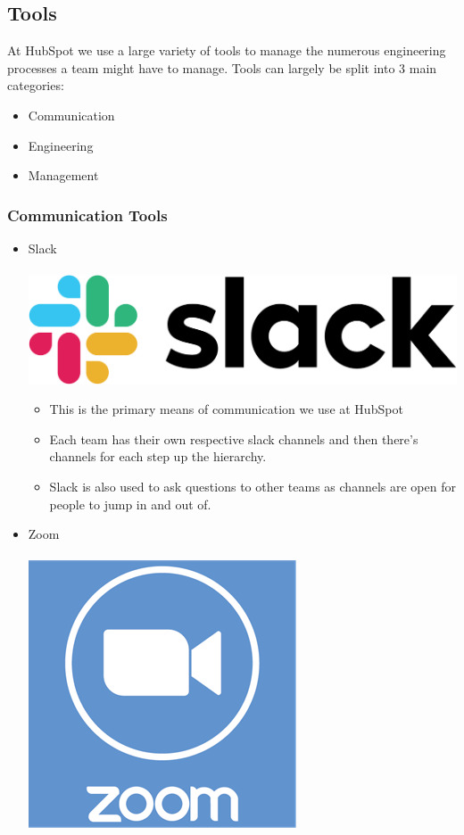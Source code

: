 \documentclass[12pt]{article} %
\begin{document}
\subsection{Tools}
At HubSpot we use a large variety of tools to manage the numerous engineering processes a team might have to manage. Tools can largely be split into 3 main categories: \begin{itemize} \item Communication \item Engineering \item Management \end{itemize}
\subsubsection{\textbf{Communication Tools}}
\begin{itemize}
\item Slack\\\\
\includegraphics[scale=0.07]{slack.png}
\begin{itemize}
\item This is the primary means of communication we use at HubSpot
\item Each team has their own respective slack channels and then there's channels for each step up the hierarchy.
\item Slack is also used to ask questions to other teams as channels are open for people to jump in and out of.
\end{itemize}
\item Zoom\\\\
\includegraphics[scale=0.2]{zoom.png}

\end{itemize}
\end{document}
